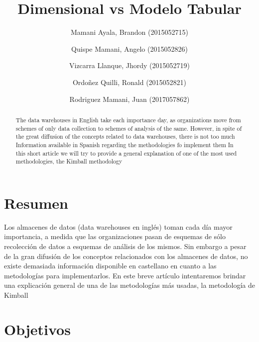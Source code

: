 \documentclass[preprint,12pt]{elsarticle}
\begin{document}
	
	\begin{frontmatter}
		
		
		\title{\huge Dimensional vs Modelo Tabular}
		
		\author{Mamani Ayala, Brandon        (2015052715)}
		\author{Quispe Mamani, Angelo	      (2015052826)}
		\author{Vizcarra Llanque, Jhordy	      (2015052719)}
		\author{Ordoñez Quilli, Ronald          (2015052821)}
		\author{Rodriguez Mamani, Juan      (2017057862)}
		
		\address{Tacna, Perú}
		
		\begin{abstract}
			
The data warehouses in English take each importance day, as organizations move from schemes of only data collection to schemes of analysis of the same. However, in spite of the great diffusion of the concepts related to data warehouses, there is not too much Information available in Spanish regarding the methodologies fo implement them In this short article we will try to provide a general explanation of one of the most used methodologies, the Kimball methodology 
		\end{abstract}
\end{frontmatter}

	
	
	\section{Resumen}
Los almacenes de datos (data warehouses en inglés) toman cada día mayor importancia, a medida que las organizaciones pasan de esquemas de sólo recolección de datos a esquemas de análisis de los mismos. Sin embargo a pesar de la gran difusión de los conceptos relacionados con los almacenes de datos, no existe demasiada información disponible en castellano en cuanto a las metodologías para implementarlos. En este breve artículo intentaremos brindar una explicación general de una de las metodologías más usadas, la metodología de Kimball \\
	
	

\section{Objetivos}

	
	
\end{document}

